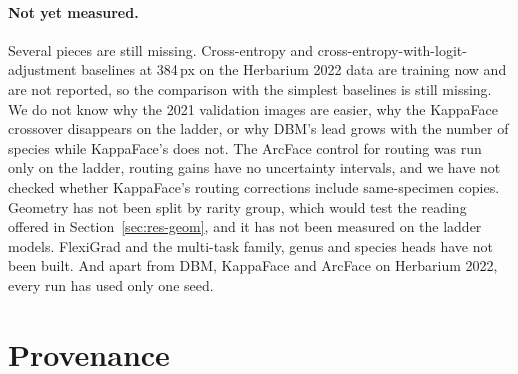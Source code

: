 \documentclass[11pt]{article}
\begin{document}
\paragraph{Not yet measured.} Several pieces are still missing. Cross-entropy and
cross-entropy-with-logit-adjustment baselines at 384\,px on the Herbarium 2022 data are
training now and are not reported, so the comparison with the simplest baselines is still
missing. We do not know why the 2021 validation images are easier, why the KappaFace
crossover disappears on the ladder, or why DBM's lead grows with the number of species
while KappaFace's does not. The ArcFace control for routing was run only on the ladder,
routing gains have no uncertainty intervals, and we have not checked whether
KappaFace's routing corrections include same-specimen copies. Geometry has not been
split by rarity group, which would test the reading offered in Section~\ref{sec:res-geom},
and it has not been measured on the ladder models. FlexiGrad and the multi-task family,
genus and species heads have not been built. And apart from DBM, KappaFace and ArcFace on
Herbarium 2022, every run has used only one seed.


\clearpage
\appendix
\section{Provenance}
\label{app:prov}
\end{document}
